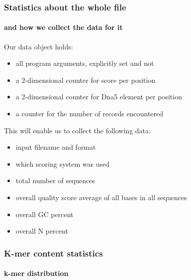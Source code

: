 \documentclass{beamer}
\begin{document}
\begin{frame}
 \frametitle{ Statistics about the whole file}
 \framesubtitle{and how we collect the data for it}

Our data object holds:

 \begin{itemize}
  \item all program arguments, explicitly set and not 
  \item a 2-dimensional counter for score per position 
  \item a 2-dimensional counter for Dna5 element per position 
  \item a counter for the number of records encountered
 \end{itemize}

This will enable us to collect the following data:
\begin{itemize}
 \item   input filename and format
 \item which scoring system was used
 \item   total number of sequences
 \item   overall quality score average of all bases in all sequences
 \item   overall GC percent
 \item   overall N percent
\end{itemize}
\end{frame}


\begin{frame}
 \frametitle{ K-mer content statistics}
 \framesubtitle{k-mer distribution}

\end{frame}
\end{document}
